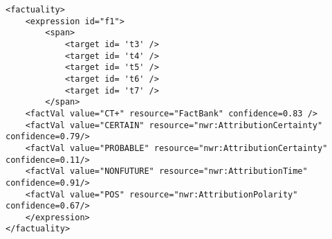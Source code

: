 \begin{verbatim}
<factuality>
    <expression id="f1">
        <span>
            <target id= 't3' />
            <target id= 't4' />
            <target id= 't5' />
            <target id= 't6' />
            <target id= 't7' />
        </span>
    <factVal value="CT+" resource="FactBank" confidence=0.83 />
    <factVal value="CERTAIN" resource="nwr:AttributionCertainty" confidence=0.79/>
    <factVal value="PROBABLE" resource="nwr:AttributionCertainty" confidence=0.11/>
    <factVal value="NONFUTURE" resource="nwr:AttributionTime" confidence=0.91/>
    <factVal value="POS" resource="nwr:AttributionPolarity" confidence=0.67/>
    </expression>
</factuality>
\end{verbatim}



